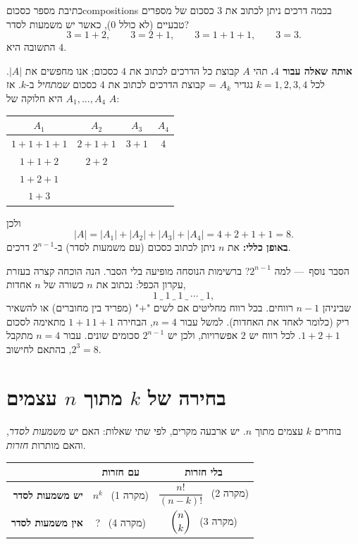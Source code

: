\documentclass[11pt,a4paper]{report}
\newcounter{todo}
\newcommand{\dash}{{\rmfamily —}}
\begin{document}
\begin{example}{כתיבת מספר כסכום}{compositions}
בכמה דרכים ניתן לכתוב את $3$ כסכום של מספרים טבעיים (לא כולל $0$), כאשר יש משמעות לסדר?
\[
  3=1+2,\qquad 3=2+1,\qquad 3=1+1+1,\qquad 3=3.
\]
התשובה היא $4$.

\medskip
\textbf{אותה שאלה עבור $4$.} תהי $A$ קבוצת כל הדרכים לכתוב את $4$ כסכום; אנו מחפשים את $|A|$.
לכל $k=1,2,3,4$ נגדיר $A_k$ = קבוצת הדרכים לכתוב את $4$ כסכום \emph{שמתחיל} ב-$k$.
אז $A_1,\dots,A_4$ היא חלוקה של $A$:
\begin{center}
\renewcommand{\arraystretch}{1.2}
\begin{tabular}{c|c|c|c}
  $A_1$ & $A_2$ & $A_3$ & $A_4$\\ \hline
  $1+1+1+1$ & $2+1+1$ & $3+1$ & $4$\\
  $1+1+2$   & $2+2$   &       &    \\
  $1+2+1$   &         &       &    \\
  $1+3$     &         &       &
\end{tabular}
\end{center}
ולכן
\[
  |A|=|A_1|+|A_2|+|A_3|+|A_4|=4+2+1+1=8.
\]
\textbf{באופן כללי:} את $n$ ניתן לכתוב כסכום (עם משמעות לסדר) ב-$2^{n-1}$ דרכים.
\end{example}

\begin{suggestion}{הסבר נוסף~\dash{} למה $2^{n-1}$?}
ברשימות הנוסחה מופיעה בלי הסבר. הנה הוכחה קצרה בעזרת עקרון הכפל: נכתוב את $n$ כשורה של $n$ אחדות,
\[
  1\ \_\ 1\ \_\ 1\ \_\ \cdots\ \_\ 1 ,
\]
שביניהן $n-1$ רווחים. בכל רווח מחליטים אם לשים "$+$" (מפריד בין מחוברים) או להשאיר ריק (כלומר לאחד את האחדות). למשל עבור $n=4$, הבחירה $1+1\,1+1$ מתאימה לסכום $1+2+1$.
לכל רווח יש $2$ אפשרויות, ולכן יש $2^{n-1}$ סכומים שונים. עבור $n=4$ מתקבל $2^3=8$, בהתאם לחישוב.
\end{suggestion}

\section{בחירה של \texorpdfstring{$k$}{k} מתוך \texorpdfstring{$n$}{n} עצמים}\label{sec:choose}

בוחרים $k$ עצמים מתוך $n$. יש ארבעה מקרים, לפי שתי שאלות: האם יש \emph{משמעות לסדר}, והאם מותרות \emph{חזרות}.

\begin{center}
\renewcommand{\arraystretch}{1.6}
\begin{tabular}{r|c|c}
  & \textbf{עם חזרות} & \textbf{בלי חזרות}\\ \hline
  \textbf{יש משמעות לסדר} & $n^k$ \ \small(מקרה 1) & $\dfrac{n!}{(n-k)!}$ \ \small(מקרה 2)\\ \hline
  \textbf{אין משמעות לסדר} & {\color{todoc}?} \ \small(מקרה 4) & $\dbinom{n}{k}$ \ \small(מקרה 3)
\end{tabular}
\end{center}
\end{document}
